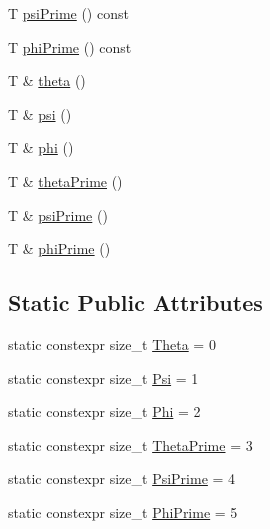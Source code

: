 \begin{DoxyCompactItemize}
\item 
T \hyperlink{classo_cpt_1_1components_1_1sensors_1_1_orientation_measurement_kalman_i_m_u_aad73d00dc09c0f0da00f28b9ac703c52}{psi\+Prime} () const
\item 
T \hyperlink{classo_cpt_1_1components_1_1sensors_1_1_orientation_measurement_kalman_i_m_u_a0b5849704f6c173ed41787f9b28a57c9}{phi\+Prime} () const
\item 
T \& \hyperlink{classo_cpt_1_1components_1_1sensors_1_1_orientation_measurement_kalman_i_m_u_a93927ee51bc5993c9fc7cfa825a0bdb5}{theta} ()
\item 
T \& \hyperlink{classo_cpt_1_1components_1_1sensors_1_1_orientation_measurement_kalman_i_m_u_af754dc9b838d65a699f9161c34715aad}{psi} ()
\item 
T \& \hyperlink{classo_cpt_1_1components_1_1sensors_1_1_orientation_measurement_kalman_i_m_u_a7ff0d891365137bed2f528f6117e8a67}{phi} ()
\item 
T \& \hyperlink{classo_cpt_1_1components_1_1sensors_1_1_orientation_measurement_kalman_i_m_u_a987232bfd59e49bd602acc0c71b69b20}{theta\+Prime} ()
\item 
T \& \hyperlink{classo_cpt_1_1components_1_1sensors_1_1_orientation_measurement_kalman_i_m_u_a3ef9614b993fc4bff6323fb83d698ef7}{psi\+Prime} ()
\item 
T \& \hyperlink{classo_cpt_1_1components_1_1sensors_1_1_orientation_measurement_kalman_i_m_u_adcc2c27d2fa557feb5ea11e674e261f0}{phi\+Prime} ()
\end{DoxyCompactItemize}
\subsection*{Static Public Attributes}
\begin{DoxyCompactItemize}
\item 
static constexpr size\+\_\+t \hyperlink{classo_cpt_1_1components_1_1sensors_1_1_orientation_measurement_kalman_i_m_u_a14e9e1fc1ed30d7a2669d11955b9af09}{Theta} = 0
\item 
static constexpr size\+\_\+t \hyperlink{classo_cpt_1_1components_1_1sensors_1_1_orientation_measurement_kalman_i_m_u_aef93336f198ae514a96a43290cfe596a}{Psi} = 1
\item 
static constexpr size\+\_\+t \hyperlink{classo_cpt_1_1components_1_1sensors_1_1_orientation_measurement_kalman_i_m_u_ae709fabcbb22cec01aab1bb96aed91fe}{Phi} = 2
\item 
static constexpr size\+\_\+t \hyperlink{classo_cpt_1_1components_1_1sensors_1_1_orientation_measurement_kalman_i_m_u_a0de05f7ddd25c4727d2ce41598cff191}{Theta\+Prime} = 3
\item 
static constexpr size\+\_\+t \hyperlink{classo_cpt_1_1components_1_1sensors_1_1_orientation_measurement_kalman_i_m_u_ae77939527f42ab7e44eae8493bb0ab37}{Psi\+Prime} = 4
\item 
static constexpr size\+\_\+t \hyperlink{classo_cpt_1_1components_1_1sensors_1_1_orientation_measurement_kalman_i_m_u_a93336a20e6a61c78da26818acae70f75}{Phi\+Prime} = 5
\end{DoxyCompactItemize}


